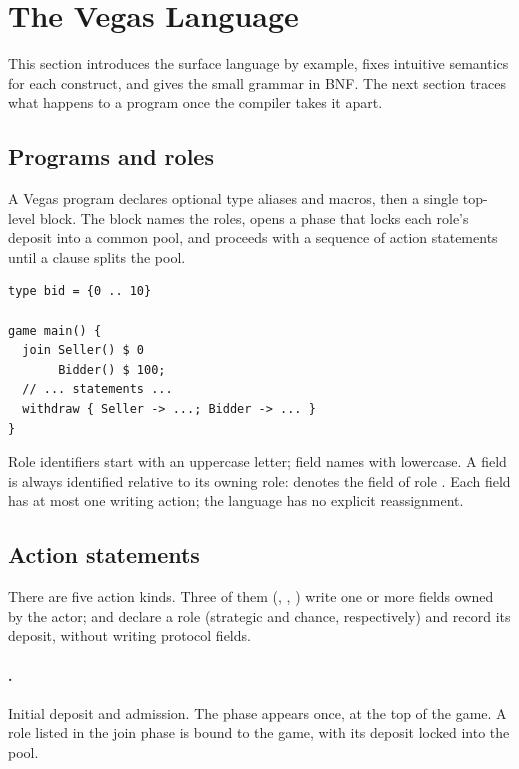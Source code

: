 \section{The Vegas Language}
\label{sec:language}

This section introduces the surface language by example, fixes
intuitive semantics for each construct, and gives the small grammar
in BNF.  The next section traces what happens to a program once the
compiler takes it apart.

\subsection{Programs and roles}

A Vegas program declares optional type aliases and macros, then a
single top-level  block.  The block names the roles, opens a
 phase that locks each role's deposit into a common pool,
and proceeds with a sequence of action statements until a
 clause splits the pool.

\begin{lstlisting}[style=vg]
type bid = {0 .. 10}

game main() {
  join Seller() $ 0
       Bidder() $ 100;
  // ... statements ...
  withdraw { Seller -> ...; Bidder -> ... }
}
\end{lstlisting}

Role identifiers start with an uppercase letter; field names with
lowercase.  A field is always identified relative to its owning
role:  denotes the field  of role .
Each field has at most one writing action; the language has no
explicit reassignment.

\subsection{Action statements}

There are five action kinds.  Three of them (,
, ) write one or more fields owned by
the actor;  and  declare a role
(strategic and chance, respectively) and record its deposit,
without writing protocol fields.

\paragraph{.}  Initial deposit and admission.  The
 phase appears once, at the top of the game.  A role listed in the join phase is bound to the game, with its
deposit locked into the pool.

